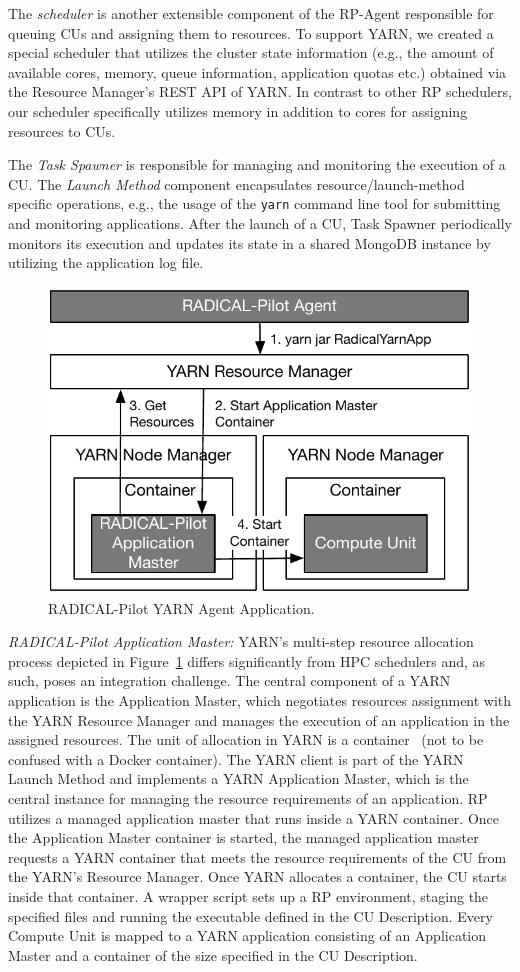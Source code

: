 The \emph{scheduler} is another extensible component of the RP-Agent
responsible for queuing CUs and assigning them to resources. To
support YARN, we created a special scheduler that utilizes the cluster state
information (e.g., the amount of available cores, memory, queue information,
application quotas etc.) obtained via the Resource Manager's REST API of YARN.
In contrast to other RP schedulers, our scheduler specifically
utilizes memory in addition to cores for assigning resources to CUs.

The \emph{Task Spawner} is responsible for managing and monitoring the execution
of a CU. The \emph{Launch Method} component encapsulates
resource/launch-method specific operations, e.g., the usage of the \texttt{yarn}
command line tool for submitting and monitoring applications. After the launch
of a CU, Task Spawner periodically monitors its execution and updates
its state in a shared MongoDB instance by utilizing the application log file.

\begin{figure}[t]
    \centering
    \includegraphics[width=.65\textwidth]{figures/data_analytics_hpc/hpc_hadoop/yarn.pdf}
    \caption{RADICAL-Pilot YARN Agent Application.}
    \label{fig:figures_yarn}
\end{figure}

\emph{RADICAL-Pilot Application Master:} YARN's multi-step resource allocation
process depicted in Figure~\ref{fig:figures_yarn} differs significantly from HPC
schedulers and, as such, poses an integration challenge. The central component
of a YARN application is the Application Master, which negotiates resources
assignment with the YARN Resource Manager and manages the execution of an
application in the assigned resources. The unit of allocation in YARN is a
container~\cite{murthy2014apache} (not to be confused with a Docker container).
The YARN client is part of the YARN Launch Method and implements a YARN
Application Master, which is the central instance for managing the resource
requirements of an application. RP utilizes a managed application
master that runs inside a YARN container. Once the Application Master container
is started, the managed application master requests a YARN container that meets
the resource requirements of the CU from the YARN's Resource Manager.
Once YARN allocates a container, the CU starts inside that container. A wrapper
script sets up a RP environment, staging the specified files and
running the executable defined in the CU Description. Every Compute
Unit is mapped to a YARN application consisting of an Application Master and a
container of the size specified in the CU Description.


